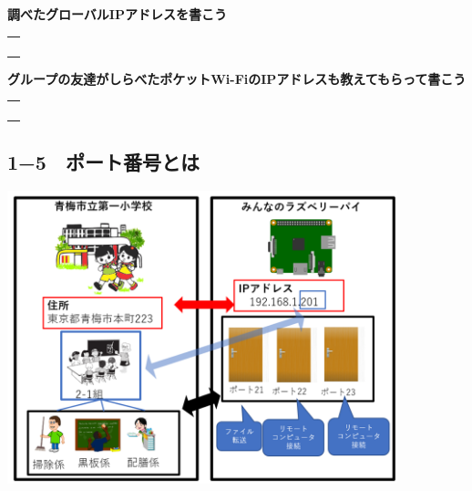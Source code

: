 \documentclass[a4paper,12pt,dvipdfmx]{jarticle}
\newcounter {PagePtr}
\begin{document}
\bigskip


\bigskip

{\bfseries
	調べたグローバルIPアドレスを書こう}


\bigskip


\centering
\begin{tabular}{|p{}|} \hline
	\\
	\\
	\\
	\\ \hline
\end{tabular}


\flushleft




\bigskip


\bigskip

{\bfseries
	グループの友達がしらべたポケットWi-FiのIPアドレスも教えてもらって書こう}



\bigskip


\centering
\begin{tabular}{|p{}|} \hline
	\\
	\\
	\\
	\\ \hline
\end{tabular}


\flushleft



\bigskip


\bigskip

\clearpage\subsection*{1−5　ポート番号とは}
\label{P:port}

\centering
\includegraphics[width=0.85\textwidth]{ome7-img020.png}
\flushleft
\end{document}
